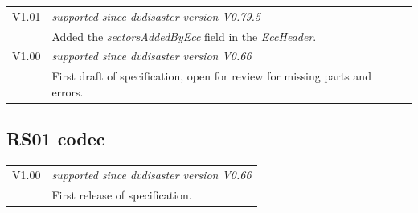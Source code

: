 \begin{tabular}{lp{14cm}}
V1.01 & {\em supported since dvdisaster version V0.79.5} \\
      & Added the {\em sectorsAddedByEcc} field in the {\em EccHeader}. \\
V1.00 & {\em supported since dvdisaster version V0.66} \\
      & First draft of specification, open for review for missing parts and errors. \\
\end{tabular}

\subsection{RS01 codec}

\begin{tabular}{lp{14cm}}
V1.00 & {\em supported since dvdisaster version V0.66} \\
      & First release of specification. \\
\end{tabular}

\newpage
